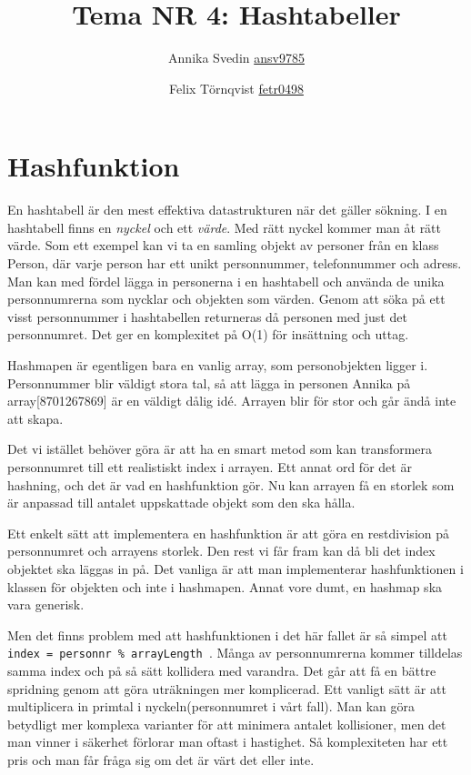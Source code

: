 \documentclass[a5paper,10pt,oneside]{article}
\title{Tema NR 4: Hashtabeller}
\author{Annika Svedin \url{ansv9785} \and Felix Törnqvist \url{fetr0498}}
\begin{document}
\maketitle
\section*{Hashfunktion}


En hashtabell är den mest effektiva datastrukturen när det gäller sökning. I en hashtabell finns en  \emph{nyckel} och ett  \emph{värde}. Med rätt nyckel kommer man åt rätt värde. Som ett exempel kan vi ta en samling objekt av personer från en klass Person, där varje person har ett unikt personnummer, telefonnummer och adress.
Man kan med fördel lägga in personerna i en hashtabell och använda de unika personnumrerna som nycklar och objekten som värden. Genom att söka på ett visst personnummer i hashtabellen returneras då personen med just det personnumret. Det ger en komplexitet på O(1) för insättning och uttag.

Hashmapen är egentligen bara en vanlig array, som personobjekten ligger i. Personnummer blir väldigt stora tal, så att lägga in personen Annika på array[8701267869] är en väldigt dålig idé. Arrayen blir för stor och går ändå inte att skapa.

Det vi istället behöver göra är att ha en smart metod som kan transformera personnumret till ett realistiskt index i arrayen. Ett annat ord för det är hashning, och det är vad en hashfunktion gör.
Nu kan arrayen få en storlek som är anpassad till antalet uppskattade objekt som den ska hålla.

Ett enkelt sätt att implementera en hashfunktion är att göra en restdivision på personnumret och arrayens storlek. Den rest vi får fram kan då bli det index objektet ska läggas in på.
Det vanliga är att man implementerar hashfunktionen i klassen för objekten och inte i hashmapen. Annat vore dumt, en hashmap ska vara generisk.

Men det finns problem med att hashfunktionen i det här fallet är så simpel att  \texttt{index = personnr \%  arrayLength }. Många av personnumrerna kommer tilldelas samma index och på så sätt kollidera med varandra. Det går att få en bättre spridning genom att göra uträkningen mer komplicerad. Ett vanligt sätt är att multiplicera in primtal i nyckeln(personnumret i vårt fall). Man kan göra betydligt mer komplexa varianter för att minimera antalet kollisioner, men det man vinner i säkerhet förlorar man oftast i hastighet. Så komplexiteten har ett pris och man får fråga sig om det är värt det eller inte.
\end{document}
